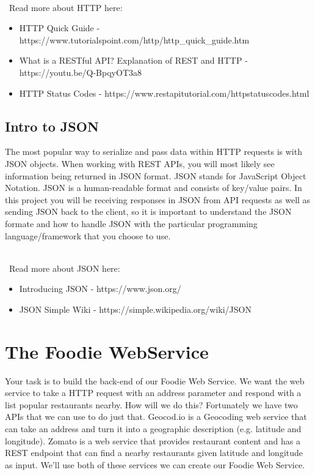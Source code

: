 \documentclass{article}
\begin{document}
\-\\\ Read more about HTTP here:
\begin{itemize}
\item HTTP Quick Guide - https://www.tutorialspoint.com/http/http\_quick\_guide.htm
\item What is a RESTful API? Explanation of REST and HTTP - https://youtu.be/Q-BpqyOT3a8
\item HTTP Status Codes - https://www.restapitutorial.com/httpstatuscodes.html
\end{itemize}

\subsection*{Intro to JSON}
The most popular way to serialize and pass data within HTTP requests is with JSON objects. When working with REST APIs, you will most likely see information being returned in JSON format. JSON stands for JavaScript Object Notation. JSON is a human-readable format and consists of key/value pairs. In this project you will be receiving responses in JSON from API requests as well as sending JSON back to the client, so it is important to understand the JSON formate and how to handle JSON with the particular programming language/framework that you choose to use. 

\-\\\ Read more about JSON here:
\begin{itemize}
\item Introducing JSON - https://www.json.org/
\item JSON Simple Wiki - https://simple.wikipedia.org/wiki/JSON
\end{itemize}


\section*{The Foodie WebService}
Your task is to build the back-end of our Foodie Web Service. We want the web service to take a HTTP request with an address parameter and respond with a list popular restaurants nearby. How will we do this? Fortunately we have two APIs that we can use to do just that. Geocod.io is a Geocoding web service that can take an address and turn it into a geographic description (e.g. latitude and longitude). Zomato is a web service that provides restaurant content and has a REST endpoint that can find a nearby restaurants given latitude and longitude as input. We'll use both of these services we can create our Foodie Web Service.
\end{document}

